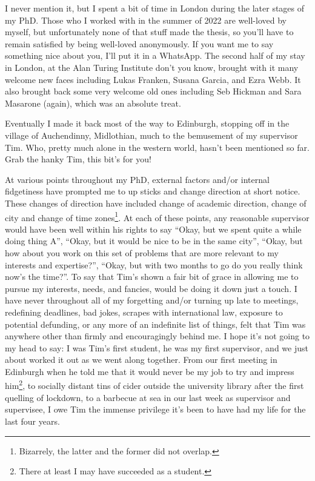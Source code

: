 \documentclass[../thesis.tex]{subfiles}
\begin{document}
I never mention it, but I spent a bit of time in London during the later stages of my PhD. Those who I worked with in the summer of 2022 are well-loved by myself, but unfortunately none of that stuff made the thesis, so you'll have to remain satisfied by being well-loved anonymously. If you want me to say something nice about you, I'll put it in a WhatsApp. The second half of my stay in London, at the Alan Turing Institute don't you know, brought with it many welcome new faces including Lukas Franken, Susana Garcia, and Ezra Webb. It also brought back some very welcome old ones including Seb Hickman and Sara Masarone (again), which was an absolute treat.

Eventually I made it back most of the way to Edinburgh, stopping off in the village of Auchendinny, Midlothian, much to the bemusement of my supervisor Tim. Who, pretty much alone in the western world, hasn't been mentioned so far. Grab the hanky Tim, this bit's for you!

At various points throughout my PhD, external factors and/or internal fidgetiness have prompted me to up sticks and change direction at short notice. These changes of direction have included change of academic direction, change of city and change of time zones\footnote{Bizarrely, the latter and the former did not overlap.}. At each of these points, any reasonable supervisor would have been well within his rights to say ``Okay, but we spent quite a while doing thing A'', ``Okay, but it would be nice to be in the same city'', ``Okay, but how about you work on this set of problems that are more relevant to my interests and expertise?'', ``Okay, but with two months to go do you really think now's the time?''. To say that Tim's shown a fair bit of grace in allowing me to pursue my interests, needs, and fancies, would be doing it down just a touch. I have never throughout all of my forgetting and/or turning up late to meetings, redefining deadlines, bad jokes, scrapes with international law, exposure to potential defunding, or any more of an indefinite list of things, felt that Tim was anywhere other than firmly and encouragingly behind me. I hope it's not going to my head to say: I was Tim's first student, he was my first supervisor, and we just about worked it out as we went along together. From our first meeting in Edinburgh when he told me that it would never be my job to try and impress him\footnote{There at least I may have succeeded as a student.}, to socially distant tins of cider outside the university library after the first quelling of lockdown, to a barbecue at sea in our last week as supervisor and supervisee, I owe Tim the immense privilege it's been to have had my life for the last four years.
\end{document}
